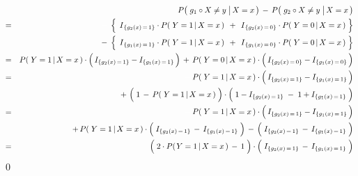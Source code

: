 \begin{eqnarray*}
&&
	P\!\left(\,\left. g_{1} \overset{{\color{white}.}}{\circ} X \neq y \;\right\vert X = x \,\right)
	\, - \,
	P\!\left(\,\left. g_{2} \overset{{\color{white}.}}{\circ} X \neq y \;\right\vert X = x \,\right)
\\
&=&
	{\color{white}- \;}
	\left\{\;
		\,\overset{{\color{white}.}}{I}_{\{g_{2}(x)\,=\,1\}} \cdot P\!\left(\,\left. Y = 1 \,\right\vert X = x \,\right)\,
		\; + \;
		\,\overset{{\color{white}.}}{I}_{\{g_{2}(x)\,=\,0\}} \cdot P\!\left(\,\left. Y = 0 \,\right\vert X = x \,\right)
		\;\right\}
\\
&&
	- \;
	\left\{\;
		\,\overset{{\color{white}.}}{I}_{\{g_{1}(x)\,=\,1\}} \cdot P\!\left(\,\left. Y = 1 \,\right\vert X = x \,\right)\,
		\; + \;
		\,\overset{{\color{white}.}}{I}_{\{g_{1}(x)\,=\,0\}} \cdot P\!\left(\,\left. Y = 0 \,\right\vert X = x \,\right)
		\;\right\}
\\
&=&
	P\!\left(\,\left. Y = 1 \,\right\vert X = x \,\right) \cdot \left(\, I_{\{g_{2}(x)\,=\,1\}} \overset{{\color{white}.}}{-} I_{\{g_{1}(x)\,=\,1\}} \,\right)
	\,+\,
	P\!\left(\,\left. Y = 0 \,\right\vert X = x \,\right) \cdot \left(\, I_{\{g_{2}(x)\,=\,0\}} \overset{{\color{white}.}}{-} I_{\{g_{1}(x)\,=\,0\}} \,\right)
\\
&=&
	{\color{white}+\,}
	P\!\left(\,\left. Y = 1 \,\right\vert X = x \,\right) \cdot \left(\, I_{\{g_{2}(x)\,=\,1\}} \overset{{\color{white}.}}{-} I_{\{g_{1}(x)\,=\,1\}} \,\right)
\\
&&
	+\,
	\left(\;\overset{{\color{white}.}}{1} \,-\, P\!\left(\,\left. Y = 1 \,\right\vert X = x \,\right)\;\right)
	\cdot
	\left(\; 1 - I_{\{g_{2}(x)\,=\,1\}} \;\overset{{\color{white}.}}{-}\; 1 + I_{\{g_{1}(x)\,=\,1\}} \;\right)
\\
&=&
	{\color{white}+\,}
	P\!\left(\,\left. Y = 1 \,\right\vert X = x \,\right) \cdot \left(\, I_{\{g_{2}(x)\,=\,1\}} \overset{{\color{white}.}}{-} I_{\{g_{1}(x)\,=\,1\}} \,\right)
\\
&&
	+\,
	P\!\left(\,\left. Y = 1 \,\right\vert X = x \,\right)
	\cdot
	\left(\; I_{\{g_{2}(x)\,=\,1\}} \,\overset{{\color{white}.}}{-}\, I_{\{g_{1}(x)\,=\,1\}} \;\right)
	\,-\,
	\left(\; I_{\{g_{2}(x)\,=\,1\}} \,\overset{{\color{white}.}}{-}\, I_{\{g_{1}(x)\,=\,1\}} \;\right)
\\
&=&
	\left(\; 2 \cdot P\!\left(\left.Y=1\,\right\vert X =x \,\right) \,\overset{{\color{white}.}}{-}\, 1 \;\right)
	\cdot
	\left(\; I_{\{g_{2}(x)\,=\,1\}} \,\overset{{\color{white}.}}{-}\, I_{\{g_{1}(x)\,=\,1\}} \;\right)
\end{eqnarray*}
\qed


\renewcommand{\theenumi}{\roman{enumi}}
\renewcommand{\labelenumi}{\textnormal{(\theenumi)}$\;\;$}


